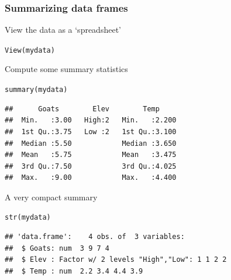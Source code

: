 \documentclass[color=usenames,dvipsnames]{beamer}\usepackage[]{graphicx}\usepackage[]{color}
\makeatletter
\newcommand{\hlstd}[1]{\textcolor[rgb]{0,0,0}{#1}}%
\newcommand{\hlkwd}[1]{\textcolor[rgb]{0.004,0.004,0.506}{#1}}%
\newenvironment{kframe}{%
 \def\at@end@of@kframe{}%
 \ifinner\ifhmode%
  \def\at@end@of@kframe{\end{minipage}}%
  \begin{minipage}{\columnwidth}%
 \fi\fi%
 \def\FrameCommand##1{\hskip\@totalleftmargin \hskip-\fboxsep
 \colorbox{shadecolor}{##1}\hskip-\fboxsep
     \hskip-\linewidth \hskip-\@totalleftmargin \hskip\columnwidth}%
 \MakeFramed {\advance\hsize-\width
   \@totalleftmargin\z@ \linewidth\hsize
   \@setminipage}}%
 {\par\unskip\endMakeFramed%
 \at@end@of@kframe}
\newenvironment{knitrout}{}{} %
\makeatother
\begin{document}
\begin{frame}[fragile]
  \frametitle{Summarizing data frames}
  \small
  View the data as a `spreadsheet'
\begin{knitrout}\footnotesize
{}\color{fgcolor}\begin{kframe}
\begin{alltt}
\hlkwd{View}\hlstd{(mydata)}
\end{alltt}
\end{kframe}
\end{knitrout}
\pause \vfill
Compute some summary statistics
\begin{knitrout}\scriptsize
{}\color{fgcolor}\begin{kframe}
\begin{alltt}
\hlkwd{summary}\hlstd{(mydata)}
\end{alltt}
\begin{verbatim}
##      Goats        Elev        Temp      
##  Min.   :3.00   High:2   Min.   :2.200  
##  1st Qu.:3.75   Low :2   1st Qu.:3.100  
##  Median :5.50            Median :3.650  
##  Mean   :5.75            Mean   :3.475  
##  3rd Qu.:7.50            3rd Qu.:4.025  
##  Max.   :9.00            Max.   :4.400
\end{verbatim}
\end{kframe}
\end{knitrout}
\pause \vfill
A very compact summary
\begin{knitrout}\scriptsize
{}\color{fgcolor}\begin{kframe}
\begin{alltt}
\hlkwd{str}\hlstd{(mydata)}
\end{alltt}
\begin{verbatim}
## 'data.frame':	4 obs. of  3 variables:
##  $ Goats: num  3 9 7 4
##  $ Elev : Factor w/ 2 levels "High","Low": 1 1 2 2
##  $ Temp : num  2.2 3.4 4.4 3.9
\end{verbatim}
\end{kframe}
\end{knitrout}
\end{frame}
\end{document}
